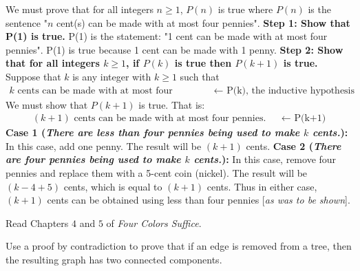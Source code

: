 \documentclass{article}
\begin{document}
We must prove that for all integers $n \geq 1$, $P(n)$ is true where $P(n)$ is the sentence "$n$ cent(s) can be made with at most four pennies". \newline
\textbf{Step 1: Show that P(1) is true.}\newline
P(1) is the statement: "1 cent can be made with at most four pennies". P(1) is true because 1 cent can be made with 1 penny. \newline
\textbf{Step 2: Show that for all integers $k \geq 1$, if $P(k)$ is true then $P(k+1)$ is true.}  \newline
Suppose that $k$ is any integer with $k \geq 1$ such that
\begin{align}
        \nonumber \text{$k$ cents can be made with at most four pennies.} &&\text{$\leftarrow$ P(k), the inductive hypothesis}
\end{align}
We must show that $P(k+1)$ is true. That is:
\begin{align}
        \nonumber \text{$(k+1)$ cents can be made with at most four pennies.} &&\text{$\leftarrow$ P(k+1)}
\end{align}
\textbf{Case 1 (\emph{There are less than four pennies being used to make $k$ cents.}):} In this case, add one penny. The result will be $(k+1)$ cents. \newline
\textbf{Case 2 (\emph{There are four pennies being used to make $k$ cents.}):} In this case, remove four pennies and replace them with a 5-cent coin (nickel). The result will be $(k-4+5)$ cents, which is equal to $(k+1)$ cents. \newline \newline
Thus in either case, $(k+1)$ cents can be obtained using less than four pennies [\emph{as was to be shown}]. 

\collab{} 

Read Chapters $4$ and $5$ of \emph{Four Colors Suffice}.

Use a proof by contradiction to prove that if an edge is removed from a
tree, then the resulting graph has two connected components.
\end{document}
